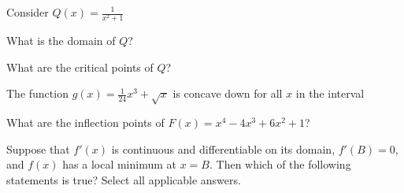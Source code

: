 \documentclass[handout]{ximera}
\begin{document}
\begin{problem}
Consider $Q(x)=\displaystyle\frac{1}{x^2+1}$

\begin{question}
What is the domain of $Q$?
\begin{multipleChoice}
	\choice [correct]{$(-\infty,\infty)$}
\end{multipleChoice}
\end{question}

\begin{question}
What are the critical points of $Q$?
\begin{multipleChoice}
\end{multipleChoice}
\end{question}

\end{problem}


\begin{problem}
The function $\displaystyle g(x) = \frac{1}{24}x^3+\sqrt{x}$ is concave down for all $x$ in the interval
\begin{multipleChoice}
\end{multipleChoice}
\end{problem}


\begin{problem}
What are the inflection points of $F(x)=x^4-4x^3+6x^2+1$?
\begin{multipleChoice}
\end{multipleChoice}
\end{problem}


\begin{problem}
Suppose that $f'(x)$ is continuous and differentiable on its domain, $f'(B)=0$, and $f(x)$ has a local minimum at $x=B$. Then which of the following statements is true? Select all applicable answers.
\begin{selectAll}
\end{selectAll}
\end{problem}
\end{document}
